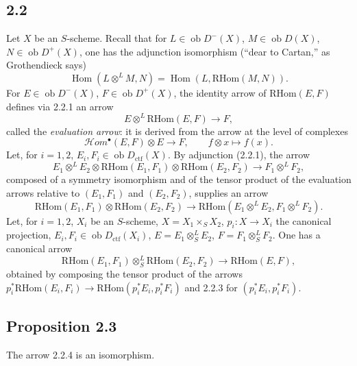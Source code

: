 \documentclass[11pt]{article}
\DeclareMathOperator{\Hom}{Hom}
\newcommand{\ob}{\operatorname{ob}}
\providecommand{\RHom}{\mathrm{RHom}}
\providecommand{\ctf}{\mathrm{ctf}}
\providecommand{\RHom}{\mathrm{RHom}}
\providecommand{\Hom}{\operatorname{Hom}}
\providecommand{\ob}{\operatorname{ob}}
\providecommand{\RHom}{\mathrm R\mathcal{H}om}
\providecommand{\RHom}{\mathrm{RHom}}
\begin{document}
\subsection*{2.2}
Let $X$ be an $S$-scheme. Recall that for $L\in\ob D^{-}(X)$, $M\in\ob D(X)$, $N\in\ob D^{+}(X)$, one has the adjunction isomorphism (``dear to Cartan,'' as Grothendieck says)
\begin{equation}\tag{2.2.1}
\Hom(L\otimes^{L}M,N)=\Hom(L,\RHom(M,N)).
\end{equation}
For $E\in\ob D^{-}(X)$, $F\in\ob D^{+}(X)$, the identity arrow of $\RHom(E,F)$ defines via 2.2.1 an arrow
\begin{equation}\tag{2.2.2}
E\otimes^{L}\RHom(E,F)\longrightarrow F,
\end{equation}
called the \emph{evaluation arrow}: it is derived from the arrow at the level of complexes
\[
\mathcal Hom^{\bullet}(E,F)\otimes E\longrightarrow F,
\qquad f\otimes x\longmapsto f(x).
\]
Let, for $i=1,2$, $E_i,F_i\in\ob D_{\ctf}(X)$. By adjunction (2.2.1), the arrow
\[
E_1\otimes^{L}E_2\otimes\RHom(E_1,F_1)\otimes\RHom(E_2,F_2)\longrightarrow F_1\otimes^{L}F_2,
\]
composed of a symmetry isomorphism and of the tensor product of the evaluation arrows relative to $(E_1,F_1)$ and $(E_2,F_2)$, supplies an arrow
\begin{equation}\tag{2.2.3}
\RHom(E_1,F_1)\otimes\RHom(E_2,F_2)\longrightarrow\RHom(E_1\otimes^{L}E_2,F_1\otimes^{L}F_2).
\end{equation}
Let, for $i=1,2$, $X_i$ be an $S$-scheme, $X=X_1\times_SX_2$, $p_i:X\to X_i$ the canonical projection, $E_i,F_i\in\ob D_{\ctf}(X_i)$, $E=E_1\otimes^{L}_{S}E_2$, $F=F_1\otimes^{L}_{S}F_2$. One has a canonical arrow
\begin{equation}\tag{2.2.4}
\RHom(E_1,F_1)\otimes^{L}_{S}\RHom(E_2,F_2)\longrightarrow\RHom(E,F),
\end{equation}
obtained by composing the tensor product of the arrows $p_i^{*}\RHom(E_i,F_i)\to\RHom(p_i^{*}E_i,p_i^{*}F_i)$ and 2.2.3 for $(p_i^{*}E_i,p_i^{*}F_i)$.

\subsection*{Proposition 2.3}
The arrow 2.2.4 is an isomorphism.
\end{document}
